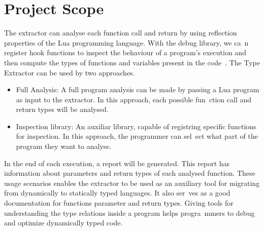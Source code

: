 
\chapter{Project Scope}
\label{cha:Project Scope}
The extractor can analyse each function call and return by using reflection properties of the Lua programming language. With the debug library, we ca\
n register hook functions to inspect the behaviour of a program's execution and then compute the types of functions and variables present in the code\
.
\newline
The Type Extractor can be used by two approaches.
\begin{itemize}
    \item{Full Analysis:} A full program analysis can be made by passing a Lua program as input to the extractor. In this approach, each possible fun\
ction call and return types will be analysed.
    \item{Inspection library:} An auxiliar library, capable of registring specific functions for inspection. In this approach, the programmer can sel\
ect what part of the program they want to analyse.
\end{itemize}
In the end of each execution, a report will be generated. This report has information about parameters and return types of each analysed function.
\newline
These usage scenarios enables the extractor to be used as an auxiliary tool for migrating from dynamically to statically typed languages. It also ser\
ves as a good documentation for functions parameter and return types. Giving tools for understanding the type relations inside a program helps progra\
mmers to debug and optimize dynamically typed code.



